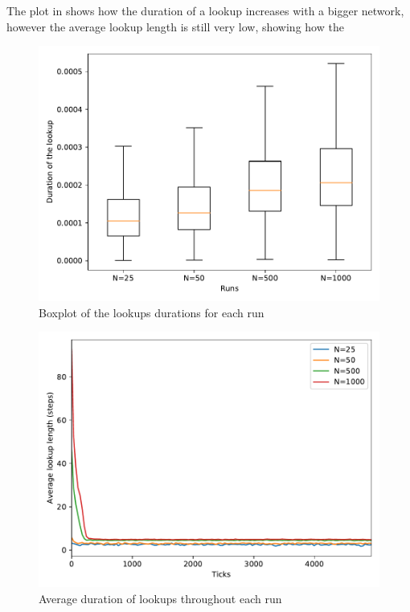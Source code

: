 \documentclass[11pt,twocolumn,letterpaper]{article}
\begin{document}
	The plot in  shows how the duration of a lookup increases with a bigger network, however the average lookup length is still very low, showing how the 

	\begin{figure}[!h]
		\centering
		\includegraphics[width=\linewidth,clip,trim=0 0.5cm 0 0.35cm]{figures/analysis2/lookupduration_box.pdf}
			\caption{Boxplot of the lookups durations for each run}
		\label{fig:netsize0}
	\end{figure}	
	\begin{figure}[!h]
		\centering
		\includegraphics[width=\linewidth,clip,trim=0 0.5cm 0 0.35cm]{figures/analysis2/lookuplength_time.pdf}
			\caption{Average duration of lookups throughout each run}
		\label{fig:netsize1}
	\end{figure}
	
\end{document}
